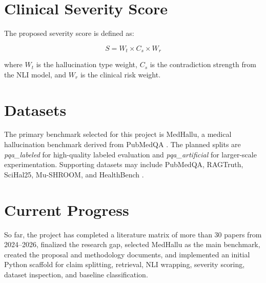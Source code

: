 \documentclass[conference]{IEEEtran}
\begin{document}
\section{Clinical Severity Score}
The proposed severity score is defined as:

\begin{equation}
S = W_t \times C_s \times W_r
\end{equation}

where $W_t$ is the hallucination type weight, $C_s$ is the contradiction strength from the NLI model, and $W_r$ is the clinical risk weight.

\section{Datasets}
The primary benchmark selected for this project is MedHallu, a medical hallucination benchmark derived from PubMedQA \cite{medhallu2025,medhalluDataset2025}. The planned splits are \textit{pqa\_labeled} for high-quality labeled evaluation and \textit{pqa\_artificial} for larger-scale experimentation. Supporting datasets may include PubMedQA, RAGTruth, SciHal25, Mu-SHROOM, and HealthBench \cite{ragtruth2024,scihalOverview2025,mushroom2025,healthbench2025}.

\section{Current Progress}
So far, the project has completed a literature matrix of more than 30 papers from 2024--2026, finalized the research gap, selected MedHallu as the main benchmark, created the proposal and methodology documents, and implemented an initial Python scaffold for claim splitting, retrieval, NLI wrapping, severity scoring, dataset inspection, and baseline classification.



\end{document}

